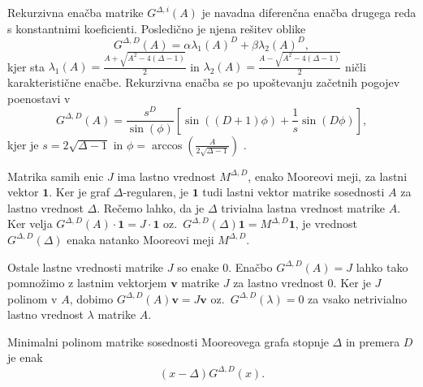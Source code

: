 \documentclass[fin1, tisk]{fmfdelo}
\begin{document}

\begin{opomba}\label{tr:moore_matrix_solution}
Rekurzivna enačba matrike $G^{\Delta, i}(A)$ je navadna diferenčna enačba 
drugega reda s konstantnimi koeficienti.
Posledično je njena rešitev oblike 
\[G^{\Delta, D}(A) = \alpha \lambda_1(A)^D + \beta \lambda_2(A)^D,\] 
kjer sta $\lambda_1(A) = \frac{A + \sqrt{A^2 - 4(\Delta-1)}}{2}$ in 
$\lambda_2(A) = \frac{A - \sqrt{A^2 - 4(\Delta-1)}}{2}$ ničli karakteristične enačbe.
Rekurzivna enačba se po upoštevanju začetnih pogojev poenostavi v
\begin{equation}
    G^{\Delta, D}(A) = \frac{s^D}{\sin(\phi)}\left[\sin((D+1)\phi) + \frac{1}{s}\sin(D\phi)\right],
\end{equation}
kjer je $s = 2\sqrt{\Delta-1}$ in $\phi=\arccos\left(\frac{A}{2\sqrt{\Delta-1}}\right)$ \cite{bannai1973finite}.
\end{opomba}

\begin{opomba}
Matrika samih enic $J$ ima lastno vrednost $M^{\Delta, D}$, enako Mooreovi meji, za lastni vektor $\mathbf{1}$.
Ker je graf $\Delta$-regularen, je $\mathbf{1}$ tudi lastni vektor matrike sosednosti $A$ za lastno vrednost $\Delta$.
Rečemo lahko, da je $\Delta$ trivialna
lastna vrednost matrike $A$. Ker velja $G^{\Delta, D}(A)\cdot\mathbf{1} = J\cdot\mathbf{1}$ oz.~$G^{\Delta, D}(\Delta)\mathbf{1} = M^{\Delta, D}\mathbf{1}$,
je vrednost $G^{\Delta, D}(\Delta)$ enaka natanko Mooreovi meji $M^{\Delta, D}$.

Ostale lastne vrednosti matrike $J$ so enake $0$.
Enačbo $G^{\Delta, D}(A) = J$ lahko tako pomnožimo z lastnim vektorjem $\mathbf{v}$
matrike $J$ za lastno vrednost $0$. Ker je $J$ polinom v $A$, dobimo $G^{\Delta, D}(A)\mathbf{v} = J\mathbf{v}$
oz.~$G^{\Delta, D}(\lambda) = 0$ za vsako netrivialno lastno 
vrednost $\lambda$ matrike $A$.
\end{opomba}

\begin{posledica}\label{po:moore_minimalni_polinom}
    Minimalni polinom matrike sosednosti Mooreovega grafa stopnje $\Delta$ in premera $D$ je enak
    $$(x - \Delta)G^{\Delta, D}(x).$$
\end{posledica}
\end{document}
